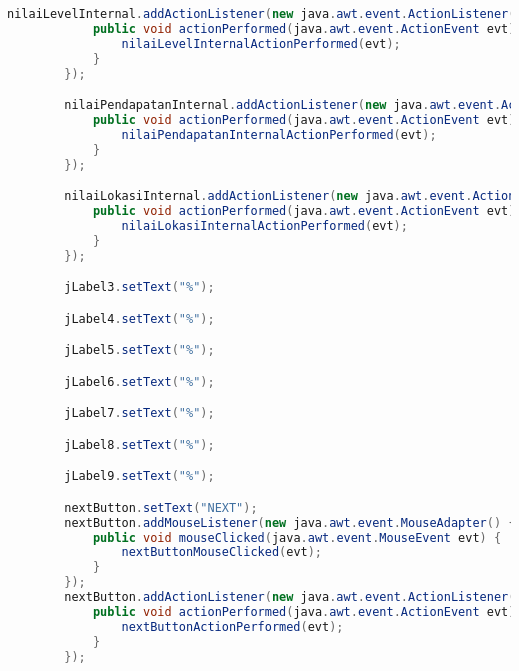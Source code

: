 \begin{lstlisting}[language=Java, caption=TampilanBobotKetetanggaan.java]
        nilaiLevelInternal.addActionListener(new java.awt.event.ActionListener() {
            public void actionPerformed(java.awt.event.ActionEvent evt) {
                nilaiLevelInternalActionPerformed(evt);
            }
        });

        nilaiPendapatanInternal.addActionListener(new java.awt.event.ActionListener() {
            public void actionPerformed(java.awt.event.ActionEvent evt) {
                nilaiPendapatanInternalActionPerformed(evt);
            }
        });

        nilaiLokasiInternal.addActionListener(new java.awt.event.ActionListener() {
            public void actionPerformed(java.awt.event.ActionEvent evt) {
                nilaiLokasiInternalActionPerformed(evt);
            }
        });

        jLabel3.setText("%");

        jLabel4.setText("%");

        jLabel5.setText("%");

        jLabel6.setText("%");

        jLabel7.setText("%");

        jLabel8.setText("%");

        jLabel9.setText("%");

        nextButton.setText("NEXT");
        nextButton.addMouseListener(new java.awt.event.MouseAdapter() {
            public void mouseClicked(java.awt.event.MouseEvent evt) {
                nextButtonMouseClicked(evt);
            }
        });
        nextButton.addActionListener(new java.awt.event.ActionListener() {
            public void actionPerformed(java.awt.event.ActionEvent evt) {
                nextButtonActionPerformed(evt);
            }
        });


\end{lstlisting}
